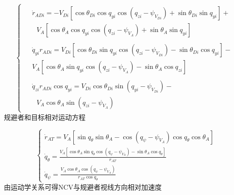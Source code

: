 \begin{equation}
\label{eq:1}
\left\{ {\begin{array}{*{20}{l}}
  \begin{aligned}
& {{\dot r}_{ADi}} =  - {V_{Di}}\left[ {\cos {\theta _{Di}}\cos {q_{yi}}\cos \left( {{q_{zi}} - {\psi _{{V_{Di}}}}} \right) + \sin {\theta _{Di}}\sin {q_{yi}}} \right] +  \\
& {\text{   }}{V_A}\left[ {\cos {\theta _A}\cos {q_{yi}}\cos \left( {{q_{zi}} - {\psi _{{V_A}}}} \right) + \sin {\theta _A}\sin {q_{yi}}} \right]
\end{aligned} \\
  \begin{aligned}
& {{\dot q}_{yi}}{r_{ADi}} = {V_{Di}}\left[ {\cos {\theta _{Di}}\sin {q_{yi}}\cos \left( {{q_{zi}} - {\psi _{{V_{Di}}}}} \right) - \sin {\theta _{Di}}\cos {q_{yi}}} \right] -  \\
& {V_A}\left[ {\cos {\theta _A}\sin {q_{yi}}\cos \left( {{q_{zi}} - {\psi _{{V_A}}}} \right) - \sin {\theta _A}\cos {q_{zi}}} \right]
\end{aligned} \\
  \begin{aligned}
& {{\dot q}_{zi}}{r_{ADi}}\cos {q_{yi}} = {V_{Di}}\cos {\theta _{Di}}\sin \left( {{q_{yi}} - {\psi _{{V_{Di}}}}} \right) -  \\
& {\text{           }}{V_A}\cos {\theta _A}\sin \left( {{q_{zi}} - {\psi _{{V_A}}}} \right)
\end{aligned}
\end{array}} \right.
\end{equation}
规避者和目标相对运动方程

\begin{equation}
\label{eq:2}
\left\{ {\begin{array}{*{20}{l}}
  {{{\dot r}_{AT}} = {V_A}\left[ {\sin {q_\theta }\sin {\theta _A} - \cos \left( {{q_\psi } - {\psi _{{V_A}}}} \right)\cos {q_\theta }\cos {\theta _A}} \right]} \\ 
  {{{\dot q}_\theta } = \frac{{{V_A}\left[ {\cos {\theta _A}\sin {q_\theta }\cos \left( {{q_\psi } - {\psi _{{V_A}}}} \right) - \sin {\theta _A}\cos {q_\theta }} \right]}}{{{r_{AT}}}}} \\ 
  {{{\dot q}_\psi } = \frac{{{V_A}\cos {\theta _A}\cos \left( {{q_\psi } - {\psi _{{V_A}}}} \right)}}{{{r_{AT}}\cos {q_\theta }}}} 
\end{array}} \right.
\end{equation}
由运动学关系可得NCV与规避者视线方向相对加速度

